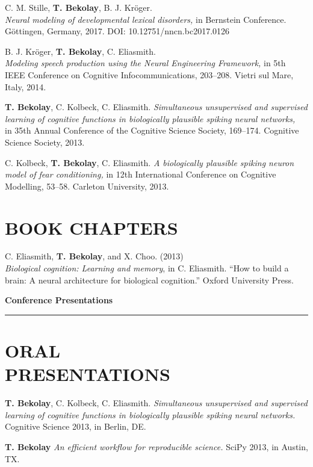 \documentclass[line,margin]{res}
\begin{document}
\begin{resume}
C. M. Stille, \textbf{T. Bekolay}, B. J. Kr\"{o}ger. \\
  {\sl Neural modeling of developmental lexical disorders,}
  in Bernstein Conference.
  G\"{o}ttingen, Germany, 2017.
  DOI: 10.12751/nncn.bc2017.0126

B. J. Kr\"{o}ger, \textbf{T. Bekolay}, C. Eliasmith. \\
  {\sl Modeling speech
  production using the Neural Engineering Framework,}
  in 5th IEEE Conference on Cognitive Infocommunications, 203--208.
  Vietri sul Mare, Italy, 2014.

\textbf{T. Bekolay}, C. Kolbeck, C. Eliasmith. {\sl Simultaneous
  unsupervised and supervised learning of cognitive functions
  in biologically plausible spiking neural networks,} \\ in 35th Annual
  Conference of the Cognitive Science Society, 169--174.
  Cognitive Science Society, 2013.

C. Kolbeck, \textbf{T. Bekolay}, C. Eliasmith. {\sl A biologically
  plausible spiking neuron model of fear conditioning,} in 12th International
  Conference on Cognitive Modelling, 53--58.
  Carleton University, 2013.

\section{BOOK CHAPTERS}

C. Eliasmith, \textbf{T. Bekolay}, and X. Choo. (2013) \\
  {\sl Biological cognition: Learning and memory}, in C. Eliasmith.
  ``How to build a brain: A neural architecture for biological cognition.''
  Oxford University Press. \vspace{0.42em}

{\Large \bf Conference Presentations} \\ \vspace{-8pt} \hrule

\section{ORAL \\PRESENTATIONS}

\textbf{T. Bekolay}, C. Kolbeck, C. Eliasmith.
  {\sl Simultaneous unsupervised and supervised learning of cognitive
  functions in biologically plausible spiking neural networks.} \\
  Cognitive Science 2013, in Berlin, DE.

\textbf{T. Bekolay} {\sl An efficient workflow for reproducible science.}
  SciPy 2013, in Austin, TX.


\end{resume}
\end{document}
